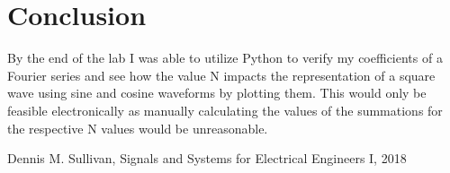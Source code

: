 \documentclass[12pt]{report}
\begin{document}
\section{Conclusion}

By the end of the lab I was able to utilize Python to verify my coefficients of a Fourier series and see how the value N impacts the representation of a square wave using sine and cosine waveforms by plotting them. This would only be feasible electronically as manually calculating the values of the summations for the respective N values would be unreasonable. 

\newpage


\begin{thebibliography}{111}
Dennis M. Sullivan,
Signals and Systems for Electrical Engineers I,
 2018
\end{thebibliography}
\end{document}

